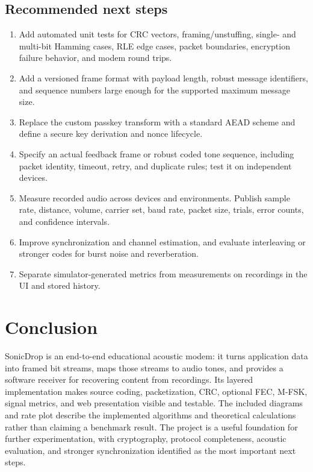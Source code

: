 \documentclass[11pt,a4paper]{article}
\begin{document}
\subsection{Recommended next steps}
\begin{enumerate}
    \item Add automated unit tests for CRC vectors, framing/unstuffing, single- and multi-bit Hamming cases, RLE edge cases, packet boundaries, encryption failure behavior, and modem round trips.
    \item Add a versioned frame format with payload length, robust message identifiers, and sequence numbers large enough for the supported maximum message size.
    \item Replace the custom passkey transform with a standard AEAD scheme and define a secure key derivation and nonce lifecycle.
    \item Specify an actual feedback frame or robust coded tone sequence, including packet identity, timeout, retry, and duplicate rules; test it on independent devices.
    \item Measure recorded audio across devices and environments. Publish sample rate, distance, volume, carrier set, baud rate, packet size, trials, error counts, and confidence intervals.
    \item Improve synchronization and channel estimation, and evaluate interleaving or stronger codes for burst noise and reverberation.
    \item Separate simulator-generated metrics from measurements on recordings in the UI and stored history.
\end{enumerate}

\section{Conclusion}
\label{sec:conclusion}

SonicDrop is an end-to-end educational acoustic modem: it turns application data into framed bit streams, maps those streams to audio tones, and provides a software receiver for recovering content from recordings. Its layered implementation makes source coding, packetization, CRC, optional FEC, M-FSK, signal metrics, and web presentation visible and testable. The included diagrams and rate plot describe the implemented algorithms and theoretical calculations rather than claiming a benchmark result. The project is a useful foundation for further experimentation, with cryptography, protocol completeness, acoustic evaluation, and stronger synchronization identified as the most important next steps.
\end{document}
